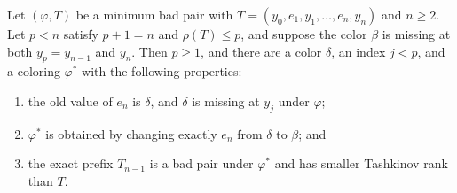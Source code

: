 \begin{helper}
Let \((\varphi,T)\) be a minimum bad pair with
\(T=(y_0,e_1,y_1,\ldots,e_n,y_n)\) and \(n\geq2\).
Let \(p<n\) satisfy \(p+1=n\) and \(\rho(T)\leq p\), and suppose
the color \(\beta\) is
missing at both \(y_p=y_{n-1}\) and \(y_n\).  Then \(p\geq1\), and
there are a color \(\delta\), an index \(j<p\), and a coloring
\(\varphi^*\) with the following properties:
\begin{enumerate}
\item the old value of \(e_n\) is \(\delta\), and \(\delta\) is missing
at \(y_j\) under \(\varphi\);
\item \(\varphi^*\) is obtained by changing exactly \(e_n\) from
\(\delta\) to \(\beta\); and
\item the exact prefix \(T_{n-1}\) is a bad pair under \(\varphi^*\)
and has smaller Tashkinov rank than \(T\).
\end{enumerate}
\end{helper}
